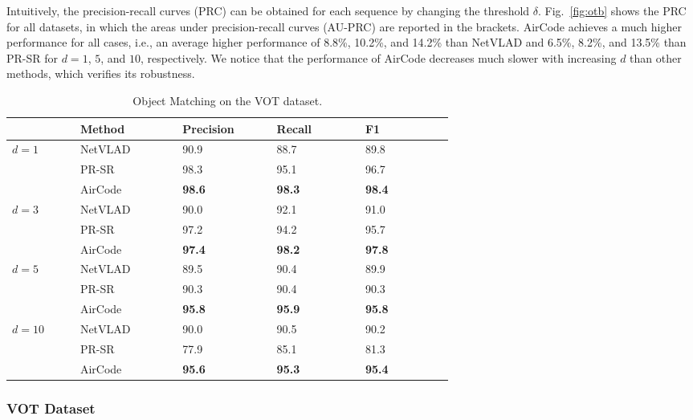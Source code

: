 \documentclass[letterpaper, 10 pt, journal, twoside]{IEEEtran}  %
\newcommand{\fref}[1]{Fig.~\ref{#1}}
\begin{document}
Intuitively, the precision-recall curves (PRC) can be obtained for each sequence by changing the threshold $\delta$.
\fref{fig:otb} shows the PRC for all datasets, in which the areas under precision-recall curves (AU-PRC) are reported in the brackets. AirCode achieves a much higher performance for all cases, i.e., an average higher performance of 8.8\%, 10.2\%, and 14.2\% than NetVLAD and 6.5\%, 8.2\%, and 13.5\% than PR-SR for $d=1$, $5$, and $10$, respectively.
We notice that the performance of AirCode decreases much slower with increasing $d$ than other methods, which verifies its robustness.

\begin{table}[t]
    \caption{Object Matching on the VOT dataset.}
    \label{tab:vot}
    \centering
    \begin{tabular}{C{0.1\linewidth}C{0.15\linewidth}C{0.13\linewidth}C{0.13\linewidth}C{0.13\linewidth}}
        \toprule
        &  Method & Precision & Recall & F1  \\ \midrule
         & NetVLAD & 90.9	& 88.7 & 89.8  \\
        & PR-SR & 98.3 & 95.1 & 96.7 \\
        & AirCode & \textbf{98.6} & \textbf{98.3} & \textbf{98.4} \\ \midrule
         & NetVLAD &90.0 & 92.1 & 91.0\\
        & PR-SR & 97.2 & 94.2 & 95.7 \\
        &AirCode & \textbf{97.4} & \textbf{98.2} & \textbf{97.8} \\ \midrule
         &  NetVLAD& 89.5 & 90.4 & 89.9 \\
        & PR-SR & 90.3 & 90.4 & 90.3 \\
        & AirCode &  \textbf{95.8} & \textbf{95.9} & \textbf{95.8}  \\ \midrule
         & NetVLAD &  90.0 &	90.5 & 90.2 \\
        & PR-SR & 77.9 & 85.1 & 81.3 \\
        & AirCode &  \textbf{95.6} & \textbf{95.3} & \textbf{95.4}  \\
        \bottomrule
    \end{tabular}
\end{table}

\subsubsection{VOT Dataset}
\end{document}
